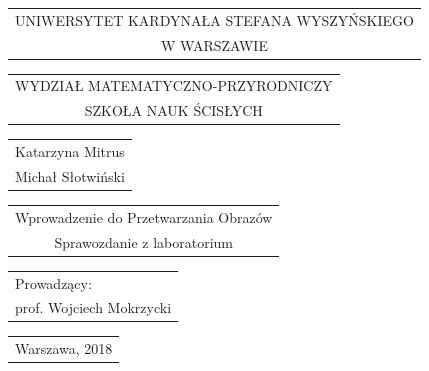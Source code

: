 \documentclass[final,a4paper,openany,12pt]{mwbk}
\begin{document}
\begin{titlepage}
\vspace{-0.5cm}

{\centering
{\footnotesize
\begin{tabular}{c}
UNIWERSYTET KARDYNAŁA STEFANA WYSZYŃSKIEGO\\
W WARSZAWIE\\
\end{tabular}
}
\vspace{2.5cm}

{\footnotesize
\begin{tabular}{c}
WYDZIAŁ MATEMATYCZNO-PRZYRODNICZY\\
SZKOŁA NAUK ŚCISŁYCH\\
\end{tabular}
}
\vspace{2.5cm}

\renewcommand{\arraystretch}{1.5} %

{\normalsize
\begin{tabular}{c}
Katarzyna Mitrus\\
Michał Słotwiński\\
\end{tabular}
}

\vspace{1.5cm}

{\large
\begin{tabular}{c}

Wprowadzenie do Przetwarzania Obrazów\\
Sprawozdanie z laboratorium\\

\end{tabular}
}

}

\renewcommand{\arraystretch}{1} %

\vspace{5cm}

\hspace{6cm}
\begin{tabular}{l}
Prowadzący:\\
prof. Wojciech Mokrzycki\\

\end{tabular}

\vspace{4cm}

{\centering

{\small
\begin{tabular}{c}
{Warszawa, 2018}\\
\end{tabular}
}

}
\end{titlepage}
\end{document}
